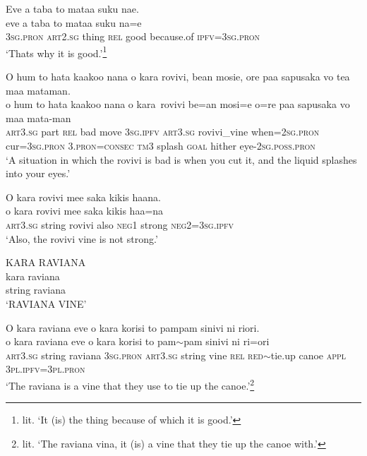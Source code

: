\ea\label{ex:text7-72}
Eve a taba to mataa suku nae.\\
\gll eve	a	taba	to	mataa	suku	na=e\\
     3\textsc{sg}.\textsc{pron}	\textsc{art}2.\textsc{sg}	thing	\textsc{rel}	good	because.of	\textsc{ipfv}=3\textsc{sg}.\textsc{pron}\\
\glt `Thats why it is good.'\footnote{lit. `It (is) the thing because of which it is good.'}
\z

\ea\label{ex:text7-73}
O hum to hata kaakoo nana o kara rovivi, bean mosie, ore paa sapusaka vo tea maa mataman.\\
\gll o	hum	to	hata	kaakoo	nana	o	kara~rovivi	be=an	mosi=e	o=re	paa	sapusaka	vo	maa	mata-man\\
     \textsc{art}3.\textsc{sg}	part	\textsc{rel}	bad	move	3\textsc{sg}.\textsc{ipfv}	\textsc{art}3.\textsc{sg}	rovivi\_vine	when=2\textsc{sg}.\textsc{pron}	cur=3\textsc{sg}.\textsc{pron}	3.\textsc{pron}=\textsc{consec}	\textsc{tm}3	splash	\textsc{goal}	hither	eye-2\textsc{sg}.\textsc{poss}.\textsc{pron}\\
\glt `A situation in which the rovivi is bad is when you cut it, and the liquid splashes into your eyes.'
\z

\ea\label{ex:text7-74}
O kara rovivi mee saka kikis haana.\\
\gll o	kara	rovivi	mee	saka	kikis	haa=na\\
     \textsc{art}3.\textsc{sg}	string	rovivi	also	\textsc{neg}1	strong	\textsc{neg}2=3\textsc{sg}.\textsc{ipfv}\\
\glt `Also, the rovivi vine is not strong.'
\z

\ea\label{ex:text7-75}
KARA RAVIANA\\
\gll kara	raviana\\
     string	raviana\\
\glt `RAVIANA VINE'
\z

\newpage
\ea\label{ex:text7-76}
O kara raviana eve o kara korisi to pampam sinivi ni riori.\\
\gll o	{kara}	raviana	eve	o	kara	korisi	to	pam{$\sim$}pam	sinivi	ni	ri=ori\\
     \textsc{art}3.\textsc{sg}	string	raviana	3\textsc{sg}.\textsc{pron}	\textsc{art}3.\textsc{sg}	string	vine	\textsc{rel}	\textsc{red}{$\sim$}tie.up	canoe	\textsc{appl}	3\textsc{pl}.\textsc{ipfv}=3\textsc{pl}.\textsc{pron}\\
\glt `The raviana is a vine that they use to tie up the canoe.'\footnote{lit. `The raviana vina, it (is) a vine that they tie up the canoe with.'}
\z


